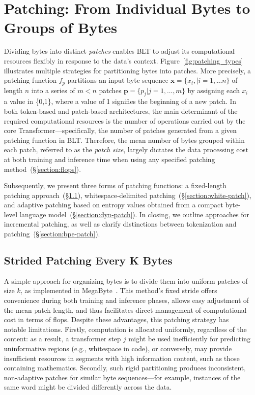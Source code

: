 \section{Patching: From Individual Bytes to Groups of Bytes}
\label{section:patching}

Dividing bytes into distinct \textit{patches} enables {\textsc BLT} to adjust its computational resources flexibly in response to the data’s context. Figure~\ref{fig:patching_types} illustrates multiple strategies for partitioning bytes into patches. More precisely, a patching function $f_p$ partitions an input byte sequence $\pmb{x}=\{x_i,|i=1,\ldots n\}$ of length $n$ into a series of $m < n$ patches $\pmb{p}=\{p_j|j=1,\ldots,m\}$ by assigning each $x_i$ a value in \{0,1\}, where a value of 1 signifies the beginning of a new patch. In both token-based and patch-based architectures, the main determinant of the required computational resources is the number of operations carried out by the core Transformer—specifically, the number of patches generated from a given patching function in {\textsc BLT}. Therefore, the mean number of bytes grouped within each patch, referred to as the \textit{patch size}, largely dictates the data processing cost at both training and inference time when using any specified patching method~(\S\ref{section:flops}).

Subsequently, we present three forms of patching functions: a fixed-length patching approach~(\S\ref{section:static-patch}), whitespace-delimited patching~(\S\ref{section:white-patch}), and adaptive patching based on entropy values obtained from a compact byte-level language model~(\S\ref{section:dyn-patch}). In closing, we outline approaches for incremental patching, as well as clarify distinctions between tokenization and patching~(\S\ref{section:bpe-patch}).

\subsection{Strided Patching Every K Bytes}
\label{section:static-patch}

A simple approach for organizing bytes is to divide them into uniform patches of size $k$, as implemented in MegaByte~\citep{yu2023megabyte}. This method's fixed stride offers convenience during both training and inference phases, allows easy adjustment of the mean patch length, and thus facilitates direct management of computational cost in terms of flops. Despite these advantages, this patching strategy has notable limitations. Firstly, computation is allocated uniformly, regardless of the content: as a result, a transformer step $j$ might be used inefficiently for predicting uninformative regions (e.g., whitespace in code), or conversely, may provide insufficient resources in segments with high information content, such as those containing mathematics. Secondly, such rigid partitioning produces inconsistent, non-adaptive patches for similar byte sequences—for example, instances of the same word might be divided differently across the data.

